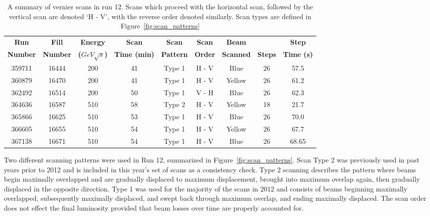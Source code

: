 \begin{table}
\centering
\begin{tabular}{ccccccccc}
\toprule
\textbf{Run}    & \textbf{Fill}   & \textbf{Energy}          & \textbf{Scan}       & \textbf{Scan}    & \textbf{Scan}  & \textbf{Beam}    &                & \textbf{Step}     \\
\textbf{Number} & \textbf{Number} & \textbf{($GeV\sqrt{s}$)} & \textbf{Time (min)} & \textbf{Pattern} & \textbf{Order} & \textbf{Scanned} & \textbf{Steps} & \textbf{Time (s)} \\
\midrule
359711 & 16444 & 200 & 41 & Type 1 & H - V & Blue  & 26 & 57.5 \\
360879 & 16470 & 200 & 41 & Type 1 & H - V & Yellow& 26 & 61.2 \\
362492 & 16514 & 200 & 50 & Type 1 & V - H & Blue  & 26 & 62.3 \\
364636 & 16587 & 510 & 58 & Type 2 & H - V & Yellow& 18 & 21.7 \\
365866 & 16625 & 510 & 53 & Type 1 & H - V & Blue  & 26 & 70.0 \\
366605 & 16655 & 510 & 54 & Type 1 & H - V & Yellow& 26 & 67.7 \\
367138 & 16671 & 510 & 54 & Type 1 & H - V & Blue  & 26 & 68.65\\
\bottomrule
\end{tabular}
\caption{ A summary of vernier scans in run 12. Scans which proceed with the
horizontal scan, followed by the vertical scan are denoted `H - V', with the
reverse order denoted similarly. Scan types are defined in
Figure~\ref{fig:scan_patterns}}
\label{tab:global_scan_summary}
\end{table}

Two different scanning patterns were used in Run 12, summarized in
Figure~\ref{fig:scan_patterns}. Scan Type 2 was previously used in past years
prior to 2012 and is included in this year's set of scans as a consistency
check. Type 2 scanning describes the pattern where beams begin maximally
overlapped and are gradually displaced to maximum displacement, brought into
maximum overlap again, then gradually displaced in the opposite direction.  Type
1 was used for the majority of the scans in 2012 and consists of beams beginning
maximally overlapped, subsequently maximally displaced, and swept back through
maximum overlap, and ending maximally displaced. The scan order does not effect
the final luminosity provided that beam losses over time are properly accounted
for.


